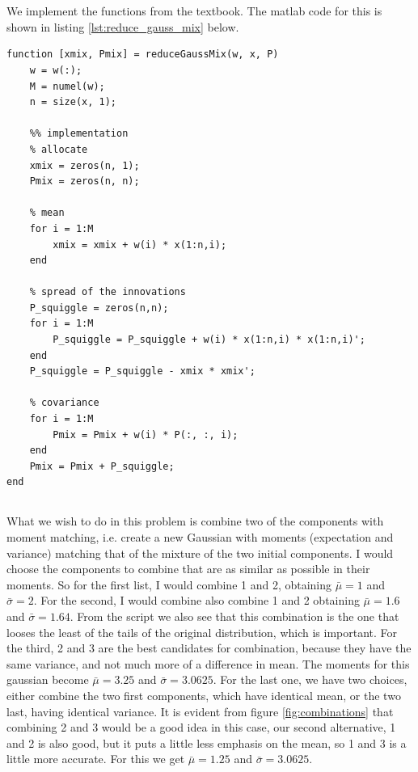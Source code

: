 \documentclass[]{article}
\title{}
\author{Sigurd Totland | MTTK}
\begin{document}
\maketitle

\section{}
\subsection{}
We implement the functions from the textbook. The matlab code for this is shown in listing \ref{lst:reduce_gauss_mix} below.
\begin{lstlisting}[label={lst:reduce_gauss_mix}, caption={reduceGaussMix.m}]
function [xmix, Pmix] = reduceGaussMix(w, x, P)
    w = w(:);
    M = numel(w);
    n = size(x, 1);

    %% implementation
    % allocate
    xmix = zeros(n, 1);
    Pmix = zeros(n, n);

    % mean
    for i = 1:M
        xmix = xmix + w(i) * x(1:n,i);
    end

    % spread of the innovations
    P_squiggle = zeros(n,n);
    for i = 1:M
        P_squiggle = P_squiggle + w(i) * x(1:n,i) * x(1:n,i)';
    end
    P_squiggle = P_squiggle - xmix * xmix';

    % covariance
    for i = 1:M
        Pmix = Pmix + w(i) * P(:, :, i);
    end
    Pmix = Pmix + P_squiggle;
end
\end{lstlisting}

\subsection{}
What we wish to do in this problem is combine two of the components with moment matching, i.e. create a new Gaussian with moments (expectation and variance) matching that of the mixture of the two initial components. I would choose the components to combine that are as similar as possible in their moments. So for the first list, I would combine 1 and 2, obtaining $\bar \mu = 1$ and $\bar \sigma = 2$. For the second, I would combine also combine 1 and 2 obtaining $\bar \mu = 1.6$ and $\bar \sigma = 1.64$. From the script we also see that this combination is the one that looses the least of the tails of the original distribution, which is important. For the third, 2 and 3 are the best candidates for combination, because they have the same variance, and not much more of a difference in mean. The moments for this gaussian become $\bar \mu = 3.25$ and $\bar \sigma = 3.0625$. For the last one, we have two choices, either combine the two first components, which have identical mean, or the two last, having identical variance. It is evident from figure \ref{fig:combinations} that combining 2 and 3 would be a good idea in this case, our second alternative, 1 and 2 is also good, but it puts a little less emphasis on the mean, so 1 and 3 is a little more accurate. For this we get $\bar \mu = 1.25$ and $\bar \sigma = 3.0625$.
\end{document}
